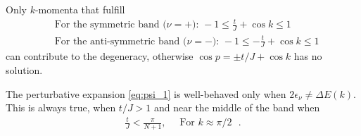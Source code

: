 \documentclass{article}
\begin{document}
\begin{tcolorbox}[title=Scatering Condition, colback=white, colframe=black]
Only $k$-momenta that fulfill
\begin{align}\label{eq:scattering_condition}
    & \text{For the symmetric band ($\nu = +$): } -1 \leq \frac{t}{J} + \cos{k} \leq 1 \\
    & \text{For the anti-symmetric band ($\nu = -$): } -1 \leq -\frac{t}{J} + \cos{k} \leq 1
\end{align}
can contribute to the degeneracy, otherwise $\cos p= \pm t/J + \cos k$ has no solution.
\end{tcolorbox}

\begin{tcolorbox}[title=Band-Gap condition, colback=white, colframe=black]
    The perturbative expansion \eqref{eq:psi_1} is well-behaved only when $2\epsilon_\nu \neq \Delta E(k)$. This is always true, when $t/J>1$ and near the middle of the band when
\begin{align}\label{eq:band_gap_condition}
    \frac{t}{J}<\frac{\pi}{N+1}, \quad \text{ For $k\approx\pi/2$ }.
\end{align}
\end{tcolorbox}
\end{document}
